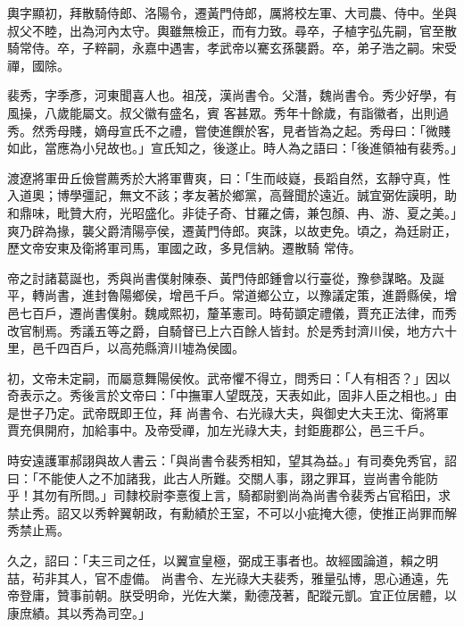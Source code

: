 \begin{pinyinscope}
 輿字顯初，拜散騎侍郎、洛陽令，遷黃門侍郎，厲將校左軍、大司農、侍中。坐與叔父不睦，出為河內太守。輿雖無檢正，而有力致。尋卒，子植字弘先嗣，官至散騎常侍。卒，子粹嗣，永嘉中遇害，孝武帝以騫玄孫襲爵。卒，弟子浩之嗣。宋受禪，國除。



 裴秀，字季彥，河東聞喜人也。祖茂，漢尚書令。父潛，魏尚書令。秀少好學，有風操，八歲能屬文。叔父徽有盛名，賓
 客甚眾。秀年十餘歲，有詣徽者，出則過秀。然秀母賤，嫡母宣氏不之禮，嘗使進饌於客，見者皆為之起。秀母曰：「微賤如此，當應為小兒故也。」宣氏知之，後遂止。時人為之語曰：「後進領袖有裴秀。」



 渡遼將軍毌丘儉嘗薦秀於大將軍曹爽，曰：「生而岐嶷，長蹈自然，玄靜守真，性入道奧；博學彊記，無文不該；孝友著於鄉黨，高聲聞於遠近。誠宜弼佐謨明，助和鼎味，毗贊大府，光昭盛化。非徒子奇、甘羅之儔，兼包顏、冉、游、夏之美。」爽乃辟為掾，襲父爵清陽亭侯，遷黃門侍郎。爽誅，以故吏免。頃之，為廷尉正，歷文帝安東及衛將軍司馬，軍國之政，多見信納。遷散騎
 常侍。



 帝之討諸葛誕也，秀與尚書僕射陳泰、黃門侍郎鍾會以行臺從，豫參謀略。及誕平，轉尚書，進封魯陽鄉侯，增邑千戶。常道鄉公立，以豫議定策，進爵縣侯，增邑七百戶，遷尚書僕射。魏咸熙初，釐革憲司。時荀顗定禮儀，賈充正法律，而秀改官制焉。秀議五等之爵，自騎督已上六百餘人皆封。於是秀封濟川侯，地方六十里，邑千四百戶，以高苑縣濟川墟為侯國。



 初，文帝未定嗣，而屬意舞陽侯攸。武帝懼不得立，問秀曰：「人有相否？」因以奇表示之。秀後言於文帝曰：「中撫軍人望既茂，天表如此，固非人臣之相也。」由是世子乃定。武帝既即王位，拜
 尚書令、右光祿大夫，與御史大夫王沈、衛將軍賈充俱開府，加給事中。及帝受禪，加左光祿大夫，封鉅鹿郡公，邑三千戶。



 時安遠護軍郝詡與故人書云：「與尚書令裴秀相知，望其為益。」有司奏免秀官，詔曰：「不能使人之不加諸我，此古人所難。交關人事，詡之罪耳，豈尚書令能防乎！其勿有所問。」司隸校尉李憙復上言，騎都尉劉尚為尚書令裴秀占官稻田，求禁止秀。詔又以秀幹翼朝政，有勳績於王室，不可以小疵掩大德，使推正尚罪而解秀禁止焉。



 久之，詔曰：「夫三司之任，以翼宣皇極，弼成王事者也。故經國論道，賴之明喆，茍非其人，官不虛備。
 尚書令、左光祿大夫裴秀，雅量弘博，思心通遠，先帝登庸，贊事前朝。朕受明命，光佐大業，勳德茂著，配蹤元凱。宜正位居體，以康庶績。其以秀為司空。」




\end{pinyinscope}
